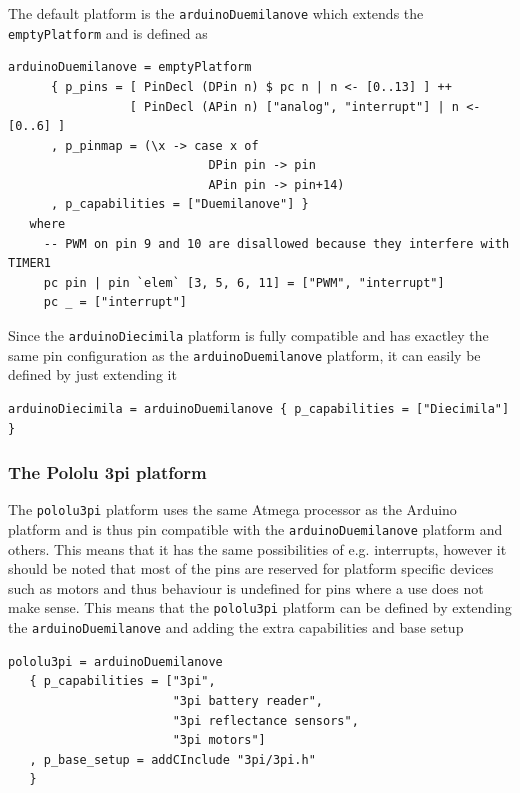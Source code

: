 \documentclass[a4paper, oneside, final]{memoir}
\begin{document}
The default platform is the \texttt{arduinoDuemilanove} which extends the
\texttt{emptyPlatform} and is defined as

\begin{verbatim}
arduinoDuemilanove = emptyPlatform 
      { p_pins = [ PinDecl (DPin n) $ pc n | n <- [0..13] ] ++
                 [ PinDecl (APin n) ["analog", "interrupt"] | n <- [0..6] ]
      , p_pinmap = (\x -> case x of
                            DPin pin -> pin
                            APin pin -> pin+14)
      , p_capabilities = ["Duemilanove"] }
   where
     -- PWM on pin 9 and 10 are disallowed because they interfere with TIMER1
     pc pin | pin `elem` [3, 5, 6, 11] = ["PWM", "interrupt"] 
     pc _ = ["interrupt"]
\end{verbatim}

Since the \texttt{arduinoDiecimila} platform is fully compatible and has
exactley the same pin configuration as the \texttt{arduinoDuemilanove} platform,
it can easily be defined by just extending it

\begin{verbatim}
arduinoDiecimila = arduinoDuemilanove { p_capabilities = ["Diecimila"] }
\end{verbatim}

\subsubsection{The Pololu 3pi platform}
\label{sec:pololu-3pi-platform}

The \texttt{pololu3pi} platform uses the same Atmega processor as the Arduino
platform and is thus pin compatible with the \texttt{arduinoDuemilanove}
platform and others. This means that it has the same possibilities of e.g.
interrupts, however it should be noted that most of the pins are reserved
\cite{3pi_pin_mapping} for platform specific devices such as motors and thus
behaviour is undefined for pins where a use does not make sense. This means that
the \texttt{pololu3pi} platform can be defined by extending the
\texttt{arduinoDuemilanove} and adding the extra capabilities and base setup

\begin{verbatim}
pololu3pi = arduinoDuemilanove 
   { p_capabilities = ["3pi", 
                       "3pi battery reader", 
                       "3pi reflectance sensors",
                       "3pi motors"]
   , p_base_setup = addCInclude "3pi/3pi.h"
   }
\end{verbatim}
\end{document}
